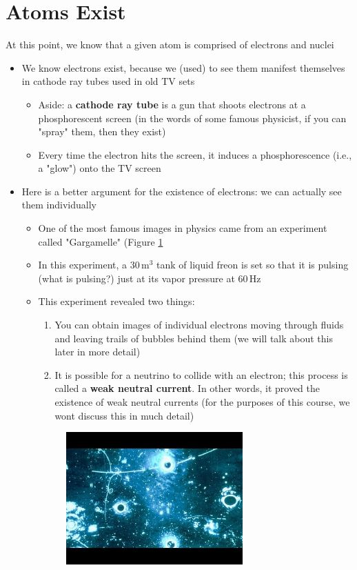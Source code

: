 \documentclass[a4paper]{article}
\begin{document}
\section{Atoms Exist}
At this point, we know that a given atom is comprised of electrons and nuclei
\begin{itemize}
    \item We know electrons exist, because we (used) to see them manifest themselves in cathode ray tubes used in old TV sets 
        \begin{itemize}
            \item Aside: a \textbf{cathode ray tube} is a gun that shoots electrons at a phosphorescent screen (in the words of some famous physicist, if you can "spray" them, then they exist)
            \item Every time the electron hits the screen, it induces a phosphorescence (i.e., a "glow") onto the TV screen 
        \end{itemize}
    \item Here is a better argument for the existence of electrons: we can actually see them individually 
        \begin{itemize}
            \item One of the most famous images in physics came from an experiment called "Gargamelle" (Figure \ref{fig:gargamelle}
            \item In this experiment, a $30 \, \mathrm{m^3}$ tank of liquid freon is set so that it is pulsing (what is pulsing?) just at its vapor pressure at $60 \, \mathrm{Hz}$
            \item This experiment revealed two things:
                \begin{enumerate}
                    \item You can obtain images of individual electrons moving through fluids and leaving trails of bubbles behind them (we will talk about this later in more detail)
                    \item It is possible for a neutrino to collide with an electron; this process is called a \textbf{weak neutral current}. In other words, it proved the existence of weak neutral currents (for the purposes of this course, we wont discuss this in much detail) 
                \end{enumerate}
            \begin{figure}%
                \centering
                \label{fig:gargamelle}%
                \includegraphics[height=2in]{Images/gargamelle_results.jpg}%

\end{figure}
\end{itemize}
\end{itemize}
\end{document}
